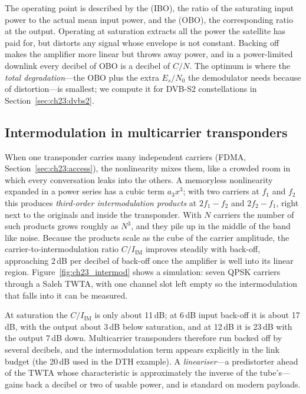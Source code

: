 
The operating point is described by the  (IBO), the ratio of the saturating
input power to the actual mean input power, and the  (OBO), the
corresponding ratio at the output. Operating at saturation extracts all the power the satellite
has paid for, but distorts any signal whose envelope is not constant. Backing off makes the
amplifier more linear but throws away power, and in a power-limited downlink every decibel of
OBO is a decibel of $C/N$. The optimum is where the \emph{total degradation}---the OBO plus the
extra $E_s/N_0$ the demodulator needs because of distortion---is smallest; we compute it for
DVB-S2 constellations in Section~\ref{sec:ch23:dvbs2}.

\subsection{Intermodulation in multicarrier transponders}

When one transponder carries many independent carriers (FDMA, Section~\ref{sec:ch23:access}), the
nonlinearity mixes them, like a crowded room in which every conversation leaks into the others.
A memoryless nonlinearity expanded in a power series has a cubic term $a_3x^3$; with two carriers
at $f_1$ and $f_2$ this produces \emph{third-order intermodulation products} at $2f_1-f_2$ and
$2f_2-f_1$, right next to the originals and inside the transponder. With $N$ carriers the number of
such products grows roughly as $N^3$, and they pile up in the middle of the band like noise.
Because the products scale as the cube of the carrier amplitude, the carrier-to-intermodulation
ratio $C/I_{\text{IM}}$ improves steadily with back-off, approaching 2\,dB per decibel of back-off
once the amplifier is well into its linear region. Figure~\ref{fig:ch23_intermod} shows a
simulation: seven QPSK carriers through a Saleh TWTA, with one channel slot left empty so the
intermodulation that falls into it can be measured.


At saturation the $C/I_{\text{IM}}$ is only about 11\,dB; at 6\,dB input back-off it is about
17\,dB, with the output about 3\,dB below saturation, and at 12\,dB it is 23\,dB with the output
7\,dB down. Multicarrier transponders therefore run backed off by several decibels, and the
intermodulation term appears explicitly in the link budget (the 20\,dB used in the DTH example). A
\emph{lineariser}---a predistorter ahead of the TWTA whose characteristic is approximately the
inverse of the tube's---gains back a decibel or two of usable power, and is standard on modern
payloads.

